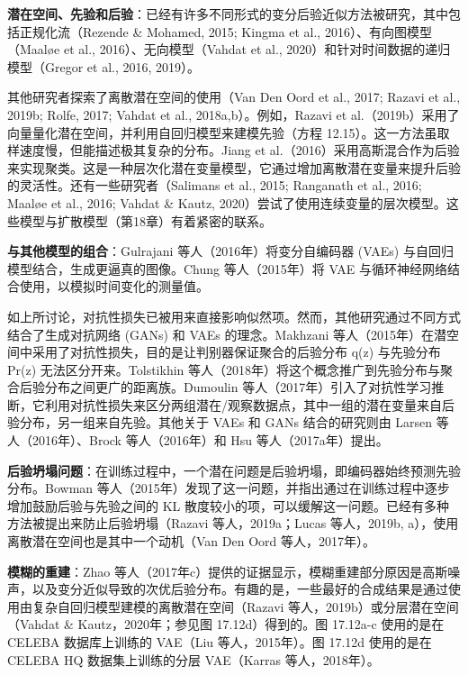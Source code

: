 \documentclass[lang=cn,newtx,10pt,scheme=chinese]{elegantbook}
\begin{document}
\textbf{潜在空间、先验和后验}：已经有许多不同形式的变分后验近似方法被研究，其中包括正规化流（Rezende \& Mohamed, 2015; Kingma et al., 2016）、有向图模型（Maaløe et al., 2016）、无向模型（Vahdat et al., 2020）和针对时间数据的递归模型（Gregor et al., 2016, 2019）。

其他研究者探索了离散潜在空间的使用（Van Den Oord et al., 2017; Razavi et al., 2019b; Rolfe, 2017; Vahdat et al., 2018a,b）。例如，Razavi et al.（2019b）采用了向量量化潜在空间，并利用自回归模型来建模先验（方程 12.15）。这一方法虽取样速度慢，但能描述极其复杂的分布。Jiang et al.（2016）采用高斯混合作为后验来实现聚类。这是一种层次化潜在变量模型，它通过增加离散潜在变量来提升后验的灵活性。还有一些研究者（Salimans et al., 2015; Ranganath et al., 2016; Maaløe et al., 2016; Vahdat \& Kautz, 2020）尝试了使用连续变量的层次模型。这些模型与扩散模型（第18章）有着紧密的联系。


\textbf{与其他模型的组合}：Gulrajani 等人（2016年）将变分自编码器 (VAEs) 与自回归模型结合，生成更逼真的图像。Chung 等人（2015年）将 VAE 与循环神经网络结合使用，以模拟时间变化的测量值。

如上所讨论，对抗性损失已被用来直接影响似然项。然而，其他研究通过不同方式结合了生成对抗网络 (GANs) 和 VAEs 的理念。Makhzani 等人（2015年）在潜空间中采用了对抗性损失，目的是让判别器保证聚合的后验分布 q(z) 与先验分布 Pr(z) 无法区分开来。Tolstikhin 等人（2018年）将这个概念推广到先验分布与聚合后验分布之间更广的距离族。Dumoulin 等人（2017年）引入了对抗性学习推断，它利用对抗性损失来区分两组潜在/观察数据点，其中一组的潜在变量来自后验分布，另一组来自先验。其他关于 VAEs 和 GANs 结合的研究则由 Larsen 等人（2016年）、Brock 等人（2016年）和 Hsu 等人（2017a年）提出。

\textbf{后验坍塌问题}：在训练过程中，一个潜在问题是后验坍塌，即编码器始终预测先验分布。Bowman 等人（2015年）发现了这一问题，并指出通过在训练过程中逐步增加鼓励后验与先验之间的 KL 散度较小的项，可以缓解这一问题。已经有多种方法被提出来防止后验坍塌（Razavi 等人，2019a；Lucas 等人，2019b, a），使用离散潜在空间也是其中一个动机（Van Den Oord 等人，2017年）。

\textbf{模糊的重建}：Zhao 等人（2017年c）提供的证据显示，模糊重建部分原因是高斯噪声，以及变分近似导致的次优后验分布。有趣的是，一些最好的合成结果是通过使用由复杂自回归模型建模的离散潜在空间（Razavi 等人，2019b）或分层潜在空间（Vahdat \& Kautz，2020年；参见图 17.12d）得到的。图 17.12a-c 使用的是在 CELEBA 数据库上训练的 VAE（Liu 等人，2015年）。图 17.12d 使用的是在 CELEBA HQ 数据集上训练的分层 VAE（Karras 等人，2018年）。
\end{document}
